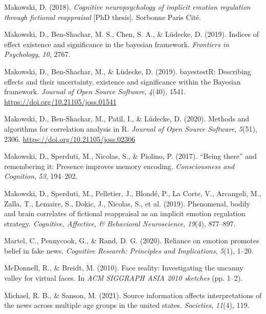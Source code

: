 \documentclass[
  man,floatsintext]{apa6}
\newlength{\cslhangindent}
\newlength{\cslentryspacingunit} %
\newenvironment{CSLReferences}[2] %
 {%
  \setlength{\parindent}{0pt}
  \ifodd #1
  \let\oldpar\par
  \def\par{\hangindent=\cslhangindent\oldpar}
  \fi
  \setlength{\parskip}{#2\cslentryspacingunit}
 }%
 {}
\begin{document}
\begin{CSLReferences}{1}{0}
\leavevmode{}%
Makowski, D. (2018). \emph{Cognitive neuropsychology of implicit emotion regulation through fictional reappraisal} {[}PhD thesis{]}. Sorbonne Paris Cit{é}.

\leavevmode{}%
Makowski, D., Ben-Shachar, M. S., Chen, S. A., \& Lüdecke, D. (2019). Indices of effect existence and significance in the bayesian framework. \emph{Frontiers in Psychology}, \emph{10}, 2767.

\leavevmode{}%
Makowski, D., Ben-Shachar, M., \& Lüdecke, D. (2019). {bayestestR}: Describing effects and their uncertainty, existence and significance within the {Bayesian} framework. \emph{Journal of Open Source Software}, \emph{4}(40), 1541. \url{https://doi.org/10.21105/joss.01541}

\leavevmode{}%
Makowski, D., Ben-Shachar, M., Patil, I., \& Lüdecke, D. (2020). Methods and algorithms for correlation analysis in {R}. \emph{Journal of Open Source Software}, \emph{5}(51), 2306. \url{https://doi.org/10.21105/joss.02306}

\leavevmode{}%
Makowski, D., Sperduti, M., Nicolas, S., \& Piolino, P. (2017). {``Being there''} and remembering it: Presence improves memory encoding. \emph{Consciousness and Cognition}, \emph{53}, 194--202.

\leavevmode{}%
Makowski, D., Sperduti, M., Pelletier, J., Blondé, P., La Corte, V., Arcangeli, M., Zalla, T., Lemaire, S., Dokic, J., Nicolas, S., et al. (2019). Phenomenal, bodily and brain correlates of fictional reappraisal as an implicit emotion regulation strategy. \emph{Cognitive, Affective, \& Behavioral Neuroscience}, \emph{19}(4), 877--897.

\leavevmode{}%
Martel, C., Pennycook, G., \& Rand, D. G. (2020). Reliance on emotion promotes belief in fake news. \emph{Cognitive Research: Principles and Implications}, \emph{5}(1), 1--20.

\leavevmode{}%
McDonnell, R., \& Breidt, M. (2010). Face reality: Investigating the uncanny valley for virtual faces. In \emph{ACM SIGGRAPH ASIA 2010 sketches} (pp. 1--2).

\leavevmode{}%
Michael, R. B., \& Sanson, M. (2021). Source information affects interpretations of the news across multiple age groups in the united states. \emph{Societies}, \emph{11}(4), 119.


\end{CSLReferences}
\end{document}
